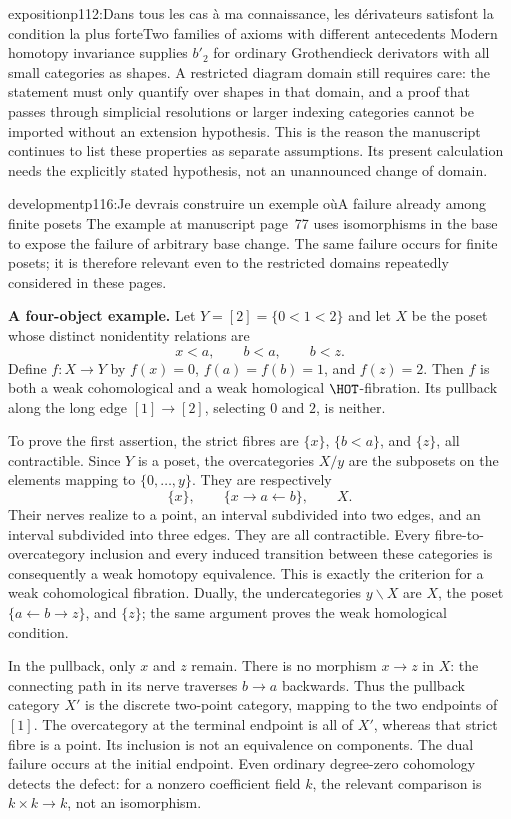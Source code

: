 \begin{dcomment}{exposition}{p112:Dans tous les cas à ma connaissance, les dérivateurs satisfont la condition la plus forte}{Two families of axioms with different antecedents}
Modern homotopy invariance supplies $b'_2$ for ordinary Grothendieck derivators with all small categories as shapes. A restricted diagram domain still requires care: the statement must only quantify over shapes in that domain, and a proof that passes through simplicial resolutions or larger indexing categories cannot be imported without an extension hypothesis. This is the reason the manuscript continues to list these properties as separate assumptions. Its present calculation needs the explicitly stated hypothesis, not an unannounced change of domain.
\end{dcomment}

\begin{dcomment}{development}{p116:Je devrais construire un exemple où}{A failure already among finite posets}
The example at manuscript page~77 uses isomorphisms in the base to expose the failure of arbitrary base change. The same failure occurs for finite posets; it is therefore relevant even to the restricted domains repeatedly considered in these pages.

\textbf{A four-object example.}\ours\quad
Let $Y=[2]=\{0<1<2\}$ and let $X$ be the poset whose distinct nonidentity relations are
\[
 x<a,\qquad b<a,\qquad b<z.
\]
Define $f:X\to Y$ by $f(x)=0$, $f(a)=f(b)=1$, and $f(z)=2$. Then $f$ is both a weak cohomological and a weak homological $\HOT$-fibration. Its pullback along the long edge $[1]\to[2]$, selecting $0$ and $2$, is neither.

To prove the first assertion, the strict fibres are $\{x\}$, $\{b<a\}$, and $\{z\}$, all contractible. Since $Y$ is a poset, the overcategories $X/y$ are the subposets on the elements mapping to $\{0,\ldots,y\}$. They are respectively
\[
 \{x\},\qquad \{x\to a\leftarrow b\},\qquad X.
\]
Their nerves realize to a point, an interval subdivided into two edges, and an interval subdivided into three edges. They are all contractible. Every fibre-to-overcategory inclusion and every induced transition between these categories is consequently a weak homotopy equivalence. This is exactly the criterion for a weak cohomological fibration. Dually, the undercategories $y\backslash X$ are $X$, the poset $\{a\leftarrow b\to z\}$, and $\{z\}$; the same argument proves the weak homological condition.

In the pullback, only $x$ and $z$ remain. There is no morphism $x\to z$ in $X$: the connecting path in its nerve traverses $b\to a$ backwards. Thus the pullback category $X'$ is the discrete two-point category, mapping to the two endpoints of $[1]$. The overcategory at the terminal endpoint is all of $X'$, whereas that strict fibre is a point. Its inclusion is not an equivalence on components. The dual failure occurs at the initial endpoint. Even ordinary degree-zero cohomology detects the defect: for a nonzero coefficient field $k$, the relevant comparison is $k\times k\to k$, not an isomorphism.


\end{dcomment}
